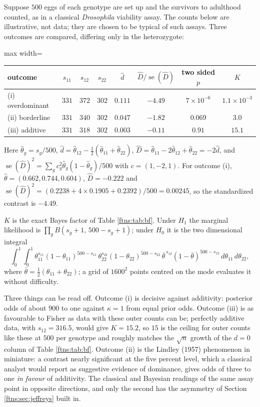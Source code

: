 \begin{example}
\label{ftns:ex:assay}
Suppose $500$ eggs of each genotype are set up and the survivors to adulthood counted, as in a
classical \emph{Drosophila} viability assay. The counts below are illustrative, not data; they are
chosen to be typical of such assays. Three outcomes are compared, differing only in the
heterozygote:
\begin{center}
\begin{adjustbox}{max width=\textwidth}
\begin{tabular}{lccccccc}
\toprule
outcome & $s_{11}$ & $s_{12}$ & $s_{22}$ & $\hat d$ & $\hat D/\operatorname{se}(\hat D)$ & two sided $p$ & $K$ \\
\midrule
(i) overdominant & $331$ & $372$ & $302$ & $0.111$ & $-4.49$ & $7\times10^{-6}$ & $1.1\times10^{-3}$ \\
(ii) borderline & $331$ & $340$ & $302$ & $0.047$ & $-1.82$ & $0.069$ & $3.0$ \\
(iii) additive & $331$ & $318$ & $302$ & $0.003$ & $-0.11$ & $0.91$ & $15.1$ \\
\bottomrule
\end{tabular}
\end{adjustbox}
\end{center}
Here $\hat\theta_g=s_g/500$, $\hat d=\hat\theta_{12}-\tfrac12(\hat\theta_{11}+\hat\theta_{22})$,
$\hat D=\hat\theta_{11}-2\hat\theta_{12}+\hat\theta_{22}=-2\hat d$, and
$\operatorname{se}(\hat D)^2=\sum_gc_g^2\hat\theta_g(1-\hat\theta_g)/500$ with $c=(1,-2,1)$. For
outcome (i), $\hat\theta=(0.662,0.744,0.604)$, $\hat D=-0.222$ and
$\operatorname{se}(\hat D)^2=(0.2238+4\times0.1905+0.2392)/500=0.00245$, so the standardized
contrast is $-4.49$.

$K$ is the exact Bayes factor of Table \ref{ftns:tab:bf}. Under $H_1$ the marginal likelihood is
$\prod_gB(s_g+1,\,500-s_g+1)$; under $H_0$ it is the two dimensional integral
\[
\int_0^1\!\!\int_0^1\theta_{11}^{s_{11}}(1-\theta_{11})^{500-s_{11}}\,
\theta_{22}^{s_{22}}(1-\theta_{22})^{500-s_{22}}\,
\bar\theta^{\,s_{12}}(1-\bar\theta)^{500-s_{12}}\,d\theta_{11}\,d\theta_{22},
\]
where $\bar\theta=\tfrac12(\theta_{11}+\theta_{22})$;
a grid of $1600^2$ points centred on the mode evaluates it without difficulty.

Three things can be read off. Outcome (i) is decisive against additivity: posterior odds of about
$900$ to one against $\kappa=1$ from equal prior odds. Outcome (iii) is as favourable to Fisher as
data with these outer counts can be; perfectly additive data, with $s_{12}=316.5$, would give $K=15.2$, so
$15$ is the ceiling for outer counts like these at $500$ per genotype and roughly matches the $\sqrt n$ growth of the $d=0$
column of Table \ref{ftns:tab:bf}. Outcome (ii) is the Lindley (1957) phenomenon in miniature: a
contrast nearly significant at the five percent level, which a classical analyst would report as
suggestive evidence of dominance, gives odds of three to one \emph{in favour} of additivity. The
classical and Bayesian readings of the same assay point in opposite directions, and only the
second has the asymmetry of Section \ref{ftns:sec:jeffreys} built in.
\end{example}

